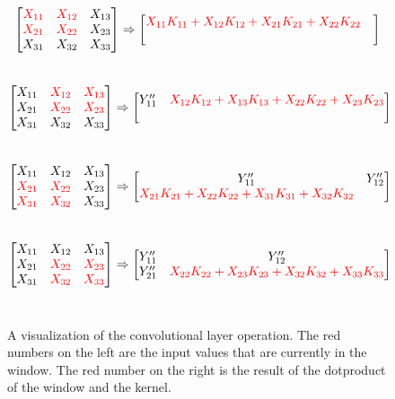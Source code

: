 \begin{figure}
    \centering
    $$\begin{bmatrix}
        \color{red} X_{11} & \color{red} X_{12} & X_{13} \\
        \color{red} X_{21} & \color{red} X_{22} & X_{23} \\
        X_{31} & X_{32} & X_{33} 
    \end{bmatrix} \Rightarrow \begin{bmatrix}
        \color{red} X_{11} K_{11} + X_{12} K_{12} + X_{21} K_{21} + X_{22} K_{22} & \\
         &
    \end{bmatrix}$$\\
    $$\begin{bmatrix}
        X_{11} & \color{red} X_{12} & \color{red} X_{13} \\
        X_{21} & \color{red} X_{22} & \color{red} X_{23} \\
        X_{31} & X_{32} & X_{33} 
    \end{bmatrix} \Rightarrow \begin{bmatrix}
         Y''_{11} &\color{red} X_{12} K_{12} + X_{13} K_{13} + X_{22} K_{22} + X_{23} K_{23} \\
         &
    \end{bmatrix}$$\\
    $$\begin{bmatrix}
        X_{11} & X_{12} & X_{13} \\
        \color{red} X_{21} & \color{red} X_{22} & X_{23} \\
        \color{red} X_{31} & \color{red} X_{32} & X_{33}
    \end{bmatrix} \Rightarrow \begin{bmatrix}
        Y''_{11} & Y''_{12} \\
        \color{red} X_{21} K_{21} + X_{22} K_{22} + X_{31} K_{31} + X_{32} K_{32} & 
    \end{bmatrix}$$\\
    $$\begin{bmatrix}
        X_{11} & X_{12} & X_{13} \\
        X_{21} & \color{red} X_{22} & \color{red} X_{23} \\
        X_{31} & \color{red} X_{32} & \color{red} X_{33}
    \end{bmatrix} \Rightarrow \begin{bmatrix}
         Y''_{11} & Y''_{12} \\
         Y''_{21} & \color{red} X_{22} K_{22} + X_{23} K_{23} + X_{32} K_{32} + X_{33} K_{33}
    \end{bmatrix}$$\\
    \caption{A visualization of the convolutional layer operation. The red numbers on the left are the input values that are currently in the window. The red number on the right is the result of the dotproduct of the window and the kernel.}
    \label{fig:conv_operation}
\end{figure}

